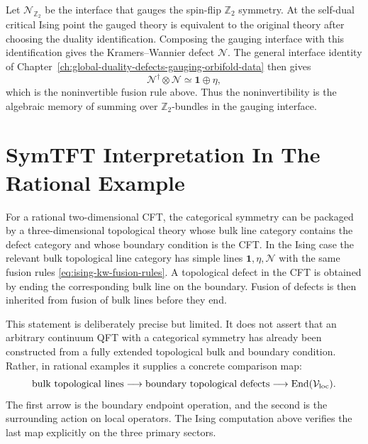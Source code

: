\begin{remark}
Let \(\mathcal N_{\mathbb Z_2}\) be the interface that gauges the spin-flip
\(\mathbb Z_2\) symmetry.  At the self-dual critical Ising point the gauged
theory is equivalent to the original theory after choosing the duality
identification.  Composing the gauging interface with this identification
gives the Kramers--Wannier defect \(\mathcal N\).  The general interface
identity of Chapter~\ref{ch:global-duality-defects-gauging-orbifold-data}
then gives
\[
  \mathcal N^\dagger\otimes\mathcal N
  \simeq
  \mathbf 1\oplus\eta ,
\]
which is the noninvertible fusion rule above.  Thus the noninvertibility is
the algebraic memory of summing over \(\mathbb Z_2\)-bundles in the gauging
interface.
\end{remark}

\section{SymTFT Interpretation In The Rational Example}

For a rational two-dimensional CFT, the categorical symmetry can be packaged
by a three-dimensional topological theory whose bulk line category contains
the defect category and whose boundary condition is the CFT.  In the Ising
case the relevant bulk topological line category has simple lines
\(\mathbf 1,\eta,\mathcal N\) with the same fusion rules
\eqref{eq:ising-kw-fusion-rules}.  A topological defect in the CFT is
obtained by ending the corresponding bulk line on the boundary.  Fusion of
defects is then inherited from fusion of bulk lines before they end.

This statement is deliberately precise but limited.  It does not assert that
an arbitrary continuum QFT with a categorical symmetry has already been
constructed from a fully extended topological bulk and boundary condition.
Rather, in rational examples it supplies a concrete comparison map:
\[
  \text{bulk topological lines}
  \longrightarrow
  \text{boundary topological defects}
  \longrightarrow
  \operatorname{End}(\mathcal V_{\rm loc}).
\]
The first arrow is the boundary endpoint operation, and the second is the
surrounding action on local operators.  The Ising computation above verifies
the last map explicitly on the three primary sectors.


